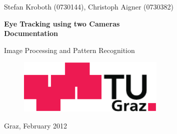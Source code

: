 \date{\today}

\begin{titlepage}
  \pagestyle{empty}
  
  \begin{center}
    {\sc\Large Stefan Kroboth (0730144), Christoph Aigner (0730382)}

    \vspace*{4cm}

    {\sffamily\bfseries\Huge Eye Tracking using two Cameras\\}
    \vspace*{0.5cm}
    {\sffamily\bfseries\Large Documentation}

    \vspace*{2cm}

    {\sc\Large Image Processing and Pattern Recognition}

    \vspace*{3cm}

    \begin{figure}[H]
      \begin{center}
        \includegraphics[width=7cm]{tug.pdf}
      \end{center}
    \end{figure}

    \vspace*{1.5cm}

    \vspace*{2cm}

    \vspace*{\fill}

    Graz, February 2012 
  \end{center}
\end{titlepage}
